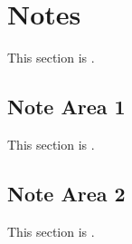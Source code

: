 
\chapter{Notes}
\label{loc:Notes}


This section is \TBD.

\section{Note Area 1}
\label{loc:Notes_1}


This section is \TBD.

\section{Note Area 2}
\label{loc:Notes_2}


This section is \TBD.
